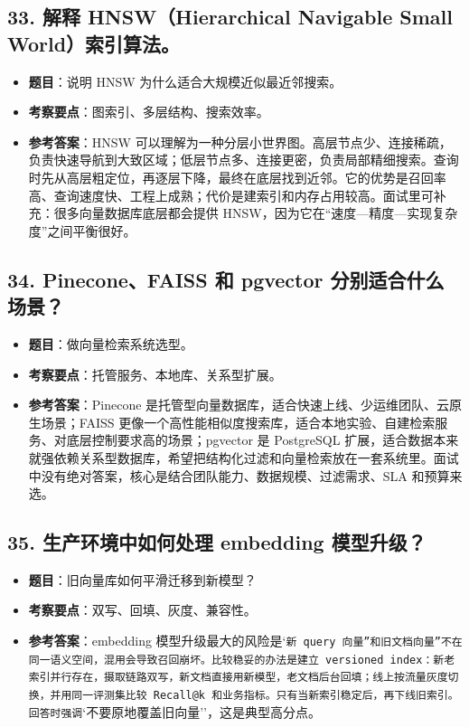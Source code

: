 \subsection{33. 解释 HNSW（Hierarchical Navigable Small World）索引算法。}
\begin{itemize}[leftmargin=2em]
\item \textbf{题目}：说明 HNSW 为什么适合大规模近似最近邻搜索。
\item \textbf{考察要点}：图索引、多层结构、搜索效率。
\item \textbf{参考答案}：HNSW 可以理解为一种分层小世界图。高层节点少、连接稀疏，负责快速导航到大致区域；低层节点多、连接更密，负责局部精细搜索。查询时先从高层粗定位，再逐层下降，最终在底层找到近邻。它的优势是召回率高、查询速度快、工程上成熟；代价是建索引和内存占用较高。面试里可补充：很多向量数据库底层都会提供 HNSW，因为它在``速度---精度---实现复杂度''之间平衡很好。
\end{itemize}

\subsection{34. Pinecone、FAISS 和 pgvector 分别适合什么场景？}
\begin{itemize}[leftmargin=2em]
\item \textbf{题目}：做向量检索系统选型。
\item \textbf{考察要点}：托管服务、本地库、关系型扩展。
\item \textbf{参考答案}：Pinecone 是托管型向量数据库，适合快速上线、少运维团队、云原生场景；FAISS 更像一个高性能相似度搜索库，适合本地实验、自建检索服务、对底层控制要求高的场景；pgvector 是 PostgreSQL 扩展，适合数据本来就强依赖关系型数据库，希望把结构化过滤和向量检索放在一套系统里。面试中没有绝对答案，核心是结合团队能力、数据规模、过滤需求、SLA 和预算来选。
\end{itemize}

\subsection{35. 生产环境中如何处理 embedding 模型升级？}
\begin{itemize}[leftmargin=2em]
\item \textbf{题目}：旧向量库如何平滑迁移到新模型？
\item \textbf{考察要点}：双写、回填、灰度、兼容性。
\item \textbf{参考答案}：embedding 模型升级最大的风险是`\texttt{新 query 向量''和}\texttt{旧文档向量''不在同一语义空间，混用会导致召回崩坏。比较稳妥的办法是建立 versioned index：新老索引并行存在，摄取链路双写，新文档直接用新模型，老文档后台回填；线上按流量灰度切换，并用同一评测集比较 Recall@k 和业务指标。只有当新索引稳定后，再下线旧索引。回答时强调}`不要原地覆盖旧向量''，这是典型高分点。
\end{itemize}

